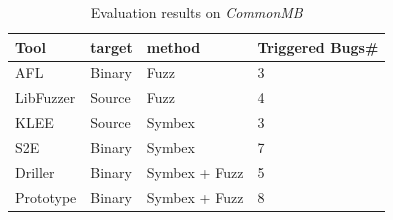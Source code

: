 \begin{table}
  \caption{\label{CommonMB-results}Evaluation results on \textit{CommonMB}}
  \centering
	\begin{tabular}{p{2cm}<{\centering} p{2cm}<{\centering} p{3cm}<{\centering} p{1.5cm}<{\centering}}
		\toprule
		Tool                     & target   & method                  & Triggered Bugs\# \\ \midrule
		AFL                      & Binary   & Fuzz                    & 3             \\
		LibFuzzer                & Source   & Fuzz                    & 4             \\
		KLEE                     & Source   & Symbex                  & 3             \\
		S2E                      & Binary   & Symbex                  & 7             \\
		Driller                  & Binary   & Symbex + Fuzz           & 5             \\
		Prototype                & Binary   & Symbex + Fuzz           & 8             \\ \bottomrule
	\end{tabular}
\end{table}

